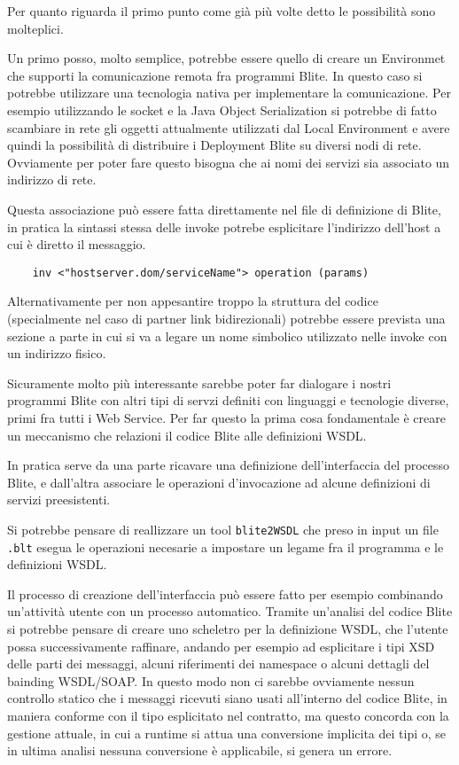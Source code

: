 Per quanto riguarda il primo punto come già più volte detto le possibilità sono
molteplici. 

Un primo posso, molto semplice, potrebbe essere quello di creare un Environmet
che supporti la comunicazione remota fra programmi Blite. In questo caso si
potrebbe utilizzare una tecnologia nativa per implementare la comunicazione. Per
esempio utilizzando le socket e la Java Object Serialization si potrebbe di
fatto scambiare in rete gli oggetti attualmente utilizzati dal Local
Environment e avere quindi la possibilità di
distribuire i Deployment Blite su diversi nodi di rete. Ovviamente per poter
fare questo bisogna che ai nomi dei servizi sia associato un indirizzo di rete.

Questa associazione può essere fatta direttamente nel file di definizione di
Blite, in pratica la sintassi stessa delle invoke potrebe esplicitare
l'indirizzo dell'host a cui è diretto il messaggio.

\begin{verbatim}
    inv <"hostserver.dom/serviceName"> operation (params) 
\end{verbatim}

Alternativamente per non appesantire troppo la struttura del codice (specialmente
nel caso di partner link bidirezionali) potrebbe essere prevista una sezione a
parte in cui si va a legare un nome simbolico utilizzato nelle invoke con un
indirizzo fisico.

Sicuramente molto più interessante sarebbe poter far dialogare i nostri programmi
Blite con altri tipi di servzi definiti con linguaggi e tecnologie diverse,
primi fra tutti i Web Service. Per far questo la prima cosa fondamentale è creare un
meccanismo che relazioni il codice Blite alle definizioni WSDL.

In pratica serve da una parte ricavare una definizione dell'interfaccia del
processo Blite, e dall'altra associare le operazioni d'invocazione ad alcune
definizioni di servizi preesistenti.

Si potrebbe pensare di reallizzare un tool \texttt{blite2WSDL} che preso in input
un file \texttt{.blt} esegua le operazioni necesarie a impostare un legame fra il
programma e le definizioni WSDL.

Il processo di creazione dell'interfaccia può essere fatto per esempio
combinando un'attività utente con un processo automatico. 
Tramite un'analisi del codice Blite si potrebbe pensare di creare uno
scheletro per la definizione WSDL, che l'utente possa successivamente
raffinare, andando per esempio ad esplicitare i tipi XSD delle parti dei
messaggi, alcuni riferimenti dei namespace o alcuni dettagli del bainding
WSDL/SOAP. In questo modo non ci sarebbe ovviamente nessun controllo statico che
i messaggi ricevuti siano usati all'interno del codice Blite, in maniera
conforme con il tipo esplicitato nel contratto, ma questo concorda con la gestione
attuale, in cui a runtime si attua una conversione implicita dei tipi o, se in
ultima analisi nessuna conversione è applicabile, si genera un errore. 

